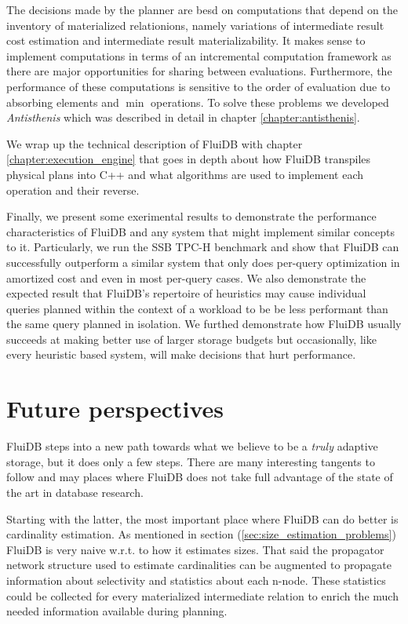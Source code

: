 The decisions made by the planner are besd on computations that depend
on the inventory of materialized relationions, namely variations of
intermediate result cost estimation and intermediate result
materializability. It makes sense to implement computations in terms
of an intcremental computation framework as there are major
opportunities for sharing between evaluations. Furthermore, the
performance of these computations is sensitive to the order of
evaluation due to absorbing elements and \(\min\) operations. To solve
these problems we developed \emph{Antisthenis} which was described in
detail in chapter \ref{chapter:antisthenis}.

We wrap up the technical description of FluiDB with chapter
\ref{chapter:execution_engine} that goes in depth about how FluiDB
transpiles physical plans into C++ and what algorithms are used to
implement each operation and their reverse.

Finally, we present some exerimental results to demonstrate the
performance characteristics of FluiDB and any system that might
implement similar concepts to it. Particularly, we run the SSB TPC-H
benchmark and show that FluiDB can successfully outperform a similar
system that only does per-query optimization in amortized cost and
even in most per-query cases. We also demonstrate the expected result
that FluiDB's repertoire of heuristics may cause individual queries
planned within the context of a workload to be be less performant than
the same query planned in isolation. We furthed demonstrate how FluiDB
usually succeeds at making better use of larger storage budgets but
occasionally, like every heuristic based system, will make decisions
that hurt performance.

\section{Future perspectives}

FluiDB steps into a new path towards what we believe to be a
\emph{truly} adaptive storage, but it does only a few steps. There are
many interesting tangents to follow and may places where FluiDB does
not take full advantage of the state of the art in database research.

Starting with the latter, the most important place where FluiDB can do
better is cardinality estimation. As mentioned in section
(\ref{sec:size_estimation_problems}) FluiDB is very naive w.r.t. to
how it estimates sizes. That said the propagator network structure
used to estimate cardinalities can be augmented to propagate
information about selectivity and statistics about each n-node. These
statistics could be collected for every materialized intermediate
relation to enrich the much needed information available during
planning.

